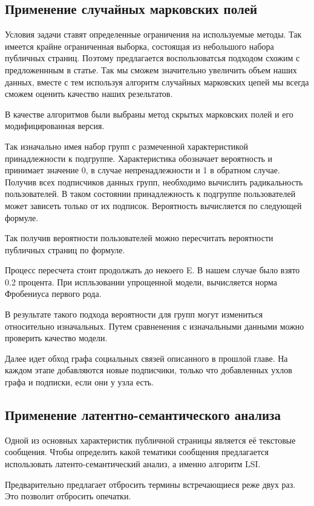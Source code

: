 \documentclass[annotation,times,page4]{itmo-student-thesis}
\begin{document}
\subsection{Применение случайных марковских полей}
Условия задачи ставят определенные ограничения на используемые методы. Так имеется крайне ограниченная выборка, состоящая из небольшого набора публичных страниц. Поэтому предлагается воспользоватсья подходом схожим с предложеннным в статье. Так мы сможем значительно увеличить объем наших данных, вместе с тем используя алгоритм случайных марковских цепей мы всегда сможем оценить качество наших резельтатов.

В качестве алгоритмов были выбраны метод скрытых марковских полей и его модифицированная версия.

Так изначально имея набор групп с размеченной характеристикой принадлежности к подгруппе. Характеристика обозначает вероятность и принимает значение 0, в случае непренадлежности и 1 в обратном случае. Получив всех подписчиков данных групп, необходимо вычислить радикальность пользователей. В таком состоянии принадлежность к подгруппе пользователей может зависеть только от их подписок. Вероятность вычисляется по следующей формуле.

Так получив вероятности пользователей можно пересчитать вероятности публичных страниц по формуле. 

Процесс пересчета стоит продолжать до некоего E. В нашем случае было взято 0.2 процента.
При испльзовании упрощенной модели, вычисляется норма Фробениуса первого рода.   

В результате такого подхода вероятности для групп могут измениться относительно изначальных. Путем сравненения с изначальными данными можно проверить качество модели.

Далее идет обход графа социальных связей описанного в прошлой главе. На каждом этапе добавляются новые подписчики, только что добавленных ухлов графа и подписки, если они у узла есть.

\subsection{Применение латентно-семантического анализа}
Одной из основных характеристик публичной страницы является её текстовые сообщения. Чтобы определить какой тематики сообщения предлагается использовать латенто-семантический анализ, а именно алгоритм LSI.

Предварительно предлагает отбросить термины встречающиеся реже двух раз. Это позволит отбросить опечатки. 
\end{document}
